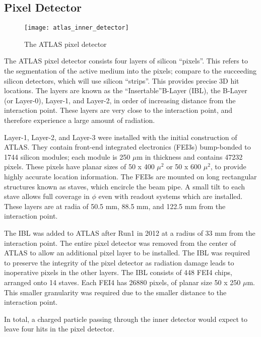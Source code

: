 \subsection{Pixel Detector}
\begin{figure}
\caption{The ATLAS pixel detector} \label{fig:atlas_inner_detector}
\texttt{[image: atlas\_inner\_detector]}
\end{figure}

The ATLAS pixel detector consists four layers of silicon ``pixels''.
This refers to the segmentation of the active medium into the pixels; compare to the succeeding silicon detectors, which will use silicon ``strips''.
This provides precise 3D hit locations.
The layers are known as the ``Insertable''\footnotemark B-Layer (IBL), the B-Layer (or Layer-0), Layer-1, and Layer-2, in order of increasing distance from the interaction point.
These layers are very close to the interaction point, and therefore experience a large amount of radiation.

Layer-1, Layer-2, and Layer-3 were installed with the initial construction of ATLAS.
They contain front-end integrated electronics (FEI3s) bump-bonded to 1744 silicon modules; each module is 250 $\mu$m in thickness and contains 47232 pixels.
These pixels have planar sizes of 50 x 400 $\mu^2$ or  50 x 600 $\mu^2$, to provide highly accurate location information.
The FEI3s are mounted on long rectangular structures known as staves, which encircle the beam pipe.
A small tilt to each stave allows full coverage in $\phi$ even with readout systems which are installed.
These layers are at radia of 50.5 mm, 88.5 mm, and 122.5 mm from the interaction point.

The IBL was added to ATLAS after Run1 in 2012 at a radius of 33 mm from the interaction point.
The entire pixel detector was removed from the center of ATLAS to allow an additional pixel layer to be installed.
The IBL was required to preserve the integrity of the pixel detector as radiation damage leads to inoperative pixels in the other layers.
The IBL consists of 448 FEI4 chips, arranged onto 14 staves.
Each FEI4 has 26880 pixels, of planar size 50 x 250 $\mu$m.
This smaller granularity was required due to the smaller distance to the interaction point.

In total, a charged particle passing through the inner detector would expect to leave four hits in the pixel detector.

